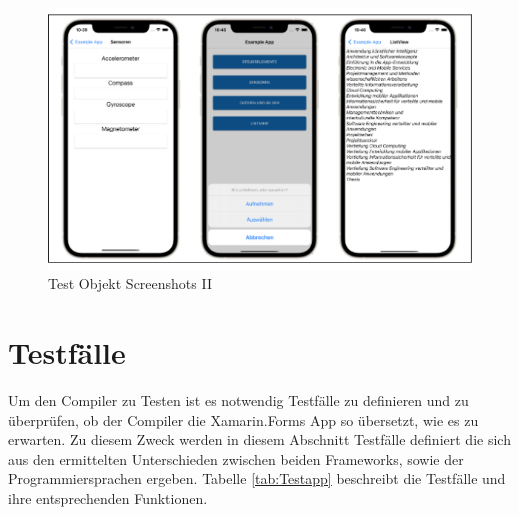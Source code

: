 \begin{figure}[!ht]
 \includegraphics[width=\textwidth,keepaspectratio]{Images/Screenshot/Sensors.png}
 \caption{Test Objekt Screenshots II}
 \label{fig:TestObjectII}
\end{figure}

\section{Testfälle}
Um den Compiler zu Testen ist es notwendig Testfälle zu definieren und zu überprüfen, ob der Compiler die Xamarin.Forms App so übersetzt, wie es zu erwarten.   Zu diesem Zweck werden in diesem Abschnitt Testfälle definiert die sich aus den ermittelten Unterschieden zwischen beiden Frameworks,  sowie der Programmiersprachen ergeben.  Tabelle \ref{tab:Testapp} beschreibt die Testfälle und ihre entsprechenden Funktionen.


